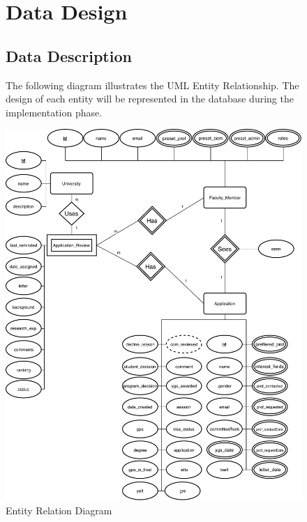 \documentclass[fontsize=12pt,paper=letter,twoside]{scrartcl}
\begin{document}
\newpage
\begin{figure}[!htb]
\section{Data Design} \label{sec:data_design}
\subsection{Data Description}

The following diagram illustrates the UML Entity Relationship. The design of each entity will be represented in the database during the implementation phase.
\begin{center}
\includegraphics[width=.99\textwidth]{images/entity_relation.pdf}
\end{center}
\caption{Entity Relation Diagram}
\label{fig:uml_entity_diagram}
\end{figure}


\clearpage
\newpage
\end{document}
